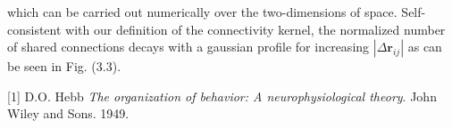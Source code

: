 \documentclass{ucetd}
\begin{document}
which can be carried out numerically over the two-dimensions of space. Self-consistent with our definition of the connectivity kernel, the normalized number of shared connections decays with a gaussian profile for increasing $|\Delta \mathbf{r}_{ij}|$ as can be seen in Fig. (3.3).

\makebibliography

[1] D.O. Hebb \textit{The organization of behavior: A neurophysiological theory}. John Wiley and Sons. 1949.

%
%
\end{document}

